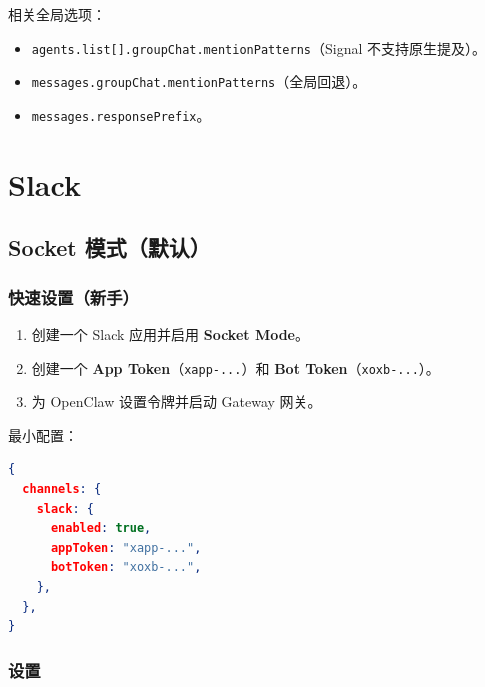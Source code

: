 相关全局选项：

\begin{itemize}
  \item \texttt{agents.list[].groupChat.mentionPatterns}（Signal 不支持原生提及）。
  \item \texttt{messages.groupChat.mentionPatterns}（全局回退）。
  \item \texttt{messages.responsePrefix}。
\end{itemize}



\clearpage

\section{Slack}


\subsection{Socket 模式（默认）}


\subsubsection{快速设置（新手）}


\begin{enumerate}
  \item 创建一个 Slack 应用并启用 \textbf{Socket Mode}。
  \item 创建一个 \textbf{App Token}（\texttt{xapp-...}）和 \textbf{Bot Token}（\texttt{xoxb-...}）。
  \item 为 OpenClaw 设置令牌并启动 Gateway 网关。
\end{enumerate}


最小配置：

\begin{lstlisting}[language=json]
{
  channels: {
    slack: {
      enabled: true,
      appToken: "xapp-...",
      botToken: "xoxb-...",
    },
  },
}
\end{lstlisting}


\subsubsection{设置}


